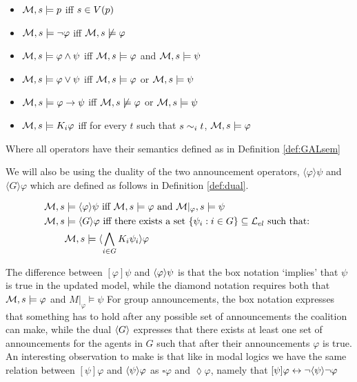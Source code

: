 \begin{definition} \hfill
	\label{def:langel}
	\begin{itemize}
		\item[] $\mathcal{M},s \models p $ iff $ s \in V(p)$
		\item[] $\mathcal{M},s \models \neg\varphi$ iff $ \mathcal{M},s \not\models \varphi$
		\item[] $\mathcal{M},s \models \varphi \wedge \psi $ iff $ \mathcal{M},s \models \varphi $ and $ \mathcal{M},s \models \psi$
		\item[] $\mathcal{M},s \models \varphi \vee \psi $ iff $ \mathcal{M},s \models \varphi $ or $ \mathcal{M},s \models \psi$
		\item[] $\mathcal{M},s \models \varphi \rightarrow \psi $ iff $ \mathcal{M},s \not\models \varphi $ or $ \mathcal{M},s \models \psi$
		\item[] $\mathcal{M},s \models K_i\varphi $ iff for every $t$ such that $s\sim_{i}t$, $\mathcal{M},s \models \varphi$
	\end{itemize}
	Where all operators have their semantics defined as in Definition \ref{def:GALsem}
\end{definition}

We will also be using the duality of the two announcement operators, $\langle\varphi\rangle\psi$ and $\langle G\rangle\varphi$ which are defined as follows in Definition \ref{def:dual}.

\begin{definition} \hfill
	\label{def:dual}
	\begin{align*}
		\mathcal{M},s &\models \langle\varphi\rangle\psi\textrm{ iff }\mathcal{M},s \models \varphi\textrm{ and }\mathcal{M}|_\varphi,s \models \psi \\
		\mathcal{M},s &\models \langle G\rangle\varphi \textrm{ iff there exists a set }\{\psi_i:i\in G\} \subseteq \textrm{$\mathcal{L}_{el}$ such that: }\\
			   &\mathcal{M},s \models \langle\bigwedge_{i\in G}K_i\psi_i\rangle\varphi
	\end{align*}

\end{definition}

The difference between $[\varphi]\psi$ and $\langle\varphi\rangle\psi$ is that the box notation `implies' that $\psi$ is true in the updated model,  while the diamond notation requires both that $\mathcal{M},s\models \varphi$ and $M|_\varphi \models \psi$ For group announcements, the box notation expresses that something has to hold after any possible set of announcements the coalition can make, while the dual $\langle G\rangle$ expresses that there exists at least one set of announcements for the agents in $G$ such that after their announcements $\varphi$ is true. An interesting observation to make is that like in modal logics we have the same relation between $[\psi]\varphi$ and $\langle\psi\rangle\varphi$ as $\square\varphi$ and $\lozenge\varphi$, namely that $[\psi]\varphi \leftrightarrow \neg\langle\psi\rangle\neg\varphi$

